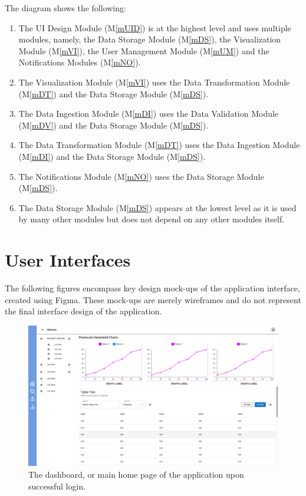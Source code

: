 \documentclass[12pt, titlepage]{article}
\newcommand{\mref}[1]{M\ref{#1}}
\begin{document}
The diagram shows the following:
\begin{enumerate}
  \item The UI Design Module (\mref{mUID}) is at the highest level and uses multiple modules, 
  namely, the Data Storage Module (\mref{mDS}), the Visualization Module (\mref{mVI}), the User 
  Management Module (\mref{mUM}) and the Notifications Modules (\mref{mNO}).
  \item The Visualization Module (\mref{mVI}) uses the Data Transformation Module (\mref{mDT})
  and the Data Storage Module (\mref{mDS}).
  \item The Data Ingestion Module (\mref{mDI}) uses the Data Validation Module (\mref{mDV}) and 
  the Data Storage Module (\mref{mDS}).
  \item The Data Transformation Module (\mref{mDT}) uses the Data Ingestion Module (\mref{mDI})
  and the Data Storage Module (\mref{mDS}).
  \item The Notifications Module (\mref{mNO}) uses the Data Storage Module (\mref{mDS}).
  \item The Data Storage Module (\mref{mDS}) appears at the lowest level as it is used by many 
  other modules but does not depend on any other modules itself.
\end{enumerate}

\section{User Interfaces}
The following figures encompass key design mock-ups of the application
interface, created using Figma. These mock-ups are merely wireframes and do not
represent the final interface design of the application.
\begin{figure}[htbp]
  \centering
  \includegraphics[width=\textwidth]{Figma/dashboard.pdf}
  \caption{The dashboard, or main home page of the application upon successful login.}
  \label{fig:FigUIDB}
\end{figure}
\end{document}
